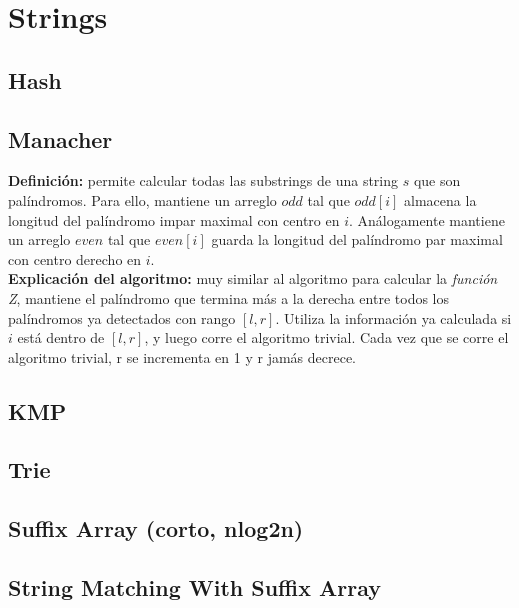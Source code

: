 \section{Strings}%
\subsection{Hash}
\subsection{Manacher}
\textbf{Definición:} permite calcular todas las substrings
de una string $s$ que son palíndromos.
Para ello, mantiene un arreglo $odd$ tal que $odd[i]$ 
almacena la longitud del palíndromo impar maximal con centro en $i$. 
Análogamente mantiene un arreglo $even$ tal que $even[i]$ guarda la 
longitud del palíndromo par maximal con centro derecho en $i$. \\
\textbf{Explicación del algoritmo:} muy similar al algoritmo para calcular
la \emph{función Z}, mantiene el palíndromo que termina más a la derecha
entre todos los palíndromos ya detectados con rango $[l, r]$. Utiliza la 
información ya calculada si $i$ está dentro de $[l, r]$, y luego corre
el algoritmo trivial. Cada vez que se corre el algoritmo trivial, r se 
incrementa en 1 y r jamás decrece.\\
\subsection{KMP}
\subsection{Trie}
\subsection{Suffix Array (corto, nlog2n)}
\subsection{String Matching With Suffix Array}
